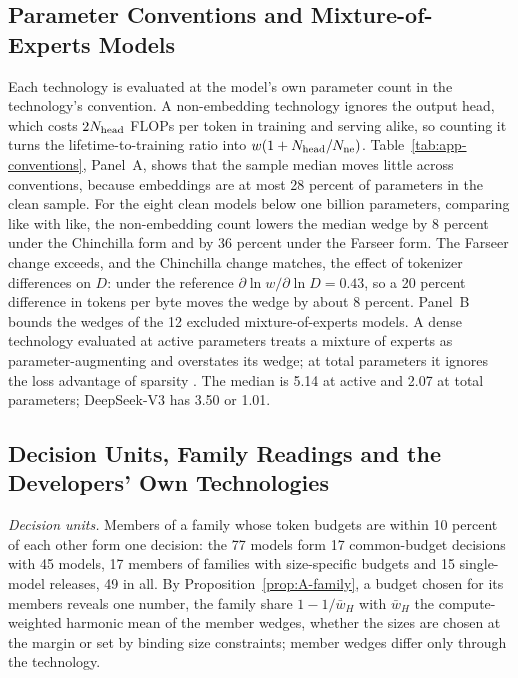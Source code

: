 

\subsection{Parameter Conventions and Mixture-of-Experts Models}\label{app:wedge-conv}

Each technology is evaluated at the model's own parameter count in the technology's convention. A non-embedding technology
ignores the output head, which costs $2N_{\rm head}$ FLOPs per token in training and serving alike, so counting it turns the
lifetime-to-training ratio into $w(1+N_{\rm head}/N_{\rm ne})$. Table~\ref{tab:app-conventions}, Panel~A, shows that the
sample median moves little across conventions, because embeddings are at most 28 percent of parameters in the clean
sample. For the eight clean models below one billion parameters, comparing like with like, the non-embedding count lowers
the median wedge by 8 percent under the Chinchilla form and by 36 percent under the Farseer form. The Farseer change
exceeds, and the Chinchilla change matches, the effect of tokenizer differences on $D$: under the reference
$\partial\ln w/\partial\ln D=0.43$, so a 20 percent difference in tokens per byte moves the wedge by about 8 percent.
Panel~B bounds the wedges of the 12 excluded mixture-of-experts models. A dense technology evaluated at active parameters
treats a mixture of experts as parameter-augmenting and overstates its wedge; at total parameters it ignores the loss
advantage of sparsity \citep{clark2022unified,krajewski2024scaling,abnar2025parameters}. The median is 5.14 at active and
2.07 at total parameters; DeepSeek-V3 has 3.50 or 1.01.



\subsection{Decision Units, Family Readings and the Developers' Own Technologies}\label{app:wedge-family}\label{app:wedge-labown}

\textit{Decision units.} Members of a family whose token budgets are within 10 percent of each other form one decision:
the 77 models form 17 common-budget decisions with 45 models, 17 members of families with size-specific budgets and 15
single-model releases, 49 in all. By Proposition~\ref{prop:A-family}, a budget chosen for its members reveals one number,
the family share $1-1/\bar w_H$ with $\bar w_H$ the compute-weighted harmonic mean of the member wedges, whether the sizes
are chosen at the margin or set by binding size constraints; member wedges differ only through the technology.

